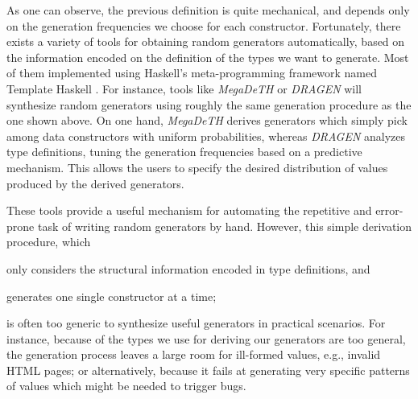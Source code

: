 %
As one can observe, the previous definition is quite mechanical, and depends
only on the generation frequencies we choose for each constructor.
%
Fortunately, there exists a variety of tools for obtaining random generators
automatically, based on the information encoded on the definition of the types
we want to generate.
%
Most of them implemented using Haskell's meta-programming framework named
Template Haskell \cite{SheardJ02}.
%
For instance, tools like \emph{MegaDeTH} \cite{GriecoCB16, grieco2017} or
\emph{DRAGEN} \cite{DBLP:conf/haskell/MistaRH18} will synthesize random
generators using roughly the same generation procedure as the one shown above.
%
On one hand, \emph{MegaDeTH} derives generators which simply pick among data
constructors with uniform probabilities, whereas \emph{DRAGEN} analyzes type
definitions, tuning the generation frequencies based on a predictive mechanism.
%
This allows the users to specify the desired distribution of values produced by
the derived generators.
%

%
These tools provide a useful mechanism for automating the repetitive and
error-prone task of writing random generators by hand.
%
However, this simple derivation procedure, which
%
\begin{inparaenum}[(i)]
\item only considers the structural information encoded in type definitions, and
\item generates one single constructor at a time;
\end{inparaenum}
%
is often too generic to synthesize useful generators in practical scenarios.
%
For instance, because of the types we use for deriving our generators are too
general, the generation process leaves a large room for ill-formed values, e.g.,
invalid HTML pages; or alternatively, because it fails at generating very
specific patterns of values which might be needed to trigger bugs.
%



